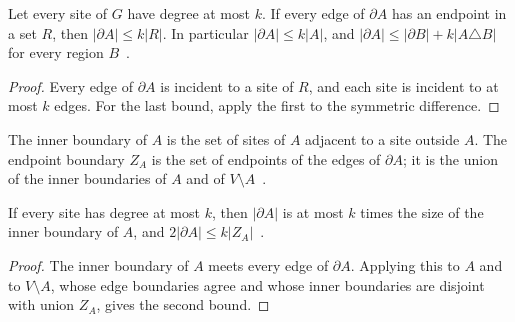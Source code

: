 \begin{lemma}
    \label{lem:sites_edge_boundary_degree}
    \leanok
    Let every site of $G$ have degree at most $k$. If every edge of $\partial A$ has an
    endpoint in a set $R$, then $|\partial A|\le k|R|$. In particular
    $|\partial A|\le k|A|$, and $|\partial A|\le|\partial B|+k|A\triangle B|$ for every
    region $B$~\cite{OpenAI2026AreaLaw}.
\end{lemma}
\begin{proof}\leanok
    Every edge of $\partial A$ is incident to a site of $R$, and each site is incident to
    at most $k$ edges. For the last bound, apply the first to the symmetric difference.
\end{proof}

\begin{definition}
    \label{def:sites_vertex_boundary}
    \leanok
    The inner boundary of $A$ is the set of sites of $A$ adjacent to a site outside $A$.
    The endpoint boundary $Z_A$ is the set of endpoints of the edges of $\partial A$; it is
    the union of the inner boundaries of $A$ and of $V\setminus A$~\cite{OpenAI2026AreaLaw}.
\end{definition}

\begin{lemma}
    \label{lem:sites_vertex_boundary}
    \leanok
    If every site has degree at most $k$, then $|\partial A|$ is at most $k$ times the
    size of the inner boundary of $A$, and $2|\partial A|\le k|Z_A|$~\cite{OpenAI2026AreaLaw}.
\end{lemma}
\begin{proof}\leanok
    The inner boundary of $A$ meets every edge of $\partial A$. Applying this to $A$ and to
    $V\setminus A$, whose edge boundaries agree and whose inner boundaries are disjoint
    with union $Z_A$, gives the second bound.
\end{proof}


